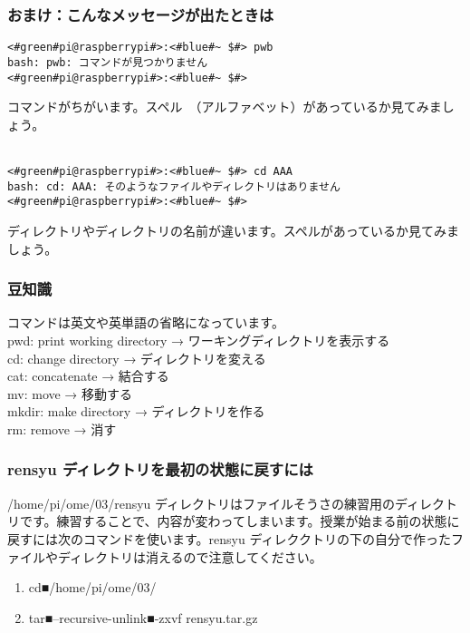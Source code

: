 \subsubsection{おまけ：こんなメッセージが出たときは}
\begin{lstlisting}[caption=コマンドがちがうときの例, label=cmdMiss]
<#green#pi@raspberrypi#>:<#blue#~ $#> pwb
bash: pwb: コマンドが見つかりません
<#green#pi@raspberrypi#>:<#blue#~ $#> 
\end{lstlisting}
コマンドがちがいます。スペル　（アルファベット）があっているか見てみましょう。\\\\

\begin{lstlisting}[caption=ディレクトリやファイルの名前がちがうときの例, label=nameMiss]
<#green#pi@raspberrypi#>:<#blue#~ $#> cd AAA
bash: cd: AAA: そのようなファイルやディレクトリはありません
<#green#pi@raspberrypi#>:<#blue#~ $#> 
\end{lstlisting}
ディレクトリやディレクトリの名前が違います。スペルがあっているか見てみましょう。\\

\subsubsection{豆知識}
コマンドは英文や英単語の省略になっています。\\
pwd: print working directory → ワーキングディレクトリを表示する\\
cd: change directory → ディレクトリを変える\\
cat: concatenate → 結合する\\
mv: move → 移動する\\
mkdir: make directory → ディレクトリを作る\\
rm: remove → 消す\\

\subsubsection{rensyu ディレクトリを最初の状態に戻すには}
/home/pi/ome/03/rensyu ディレクトリはファイルそうさの練習用のディレクトリです。練習することで、内容が変わってしまいます。授業が始まる前の状態に戻すには次のコマンドを使います。rensyu ディレククトリの下の自分で作ったファイルやディレクトリは消えるので注意してください。\\
\begin{enumerate}
\item  cd■/home/pi/ome/03/
\item  tar■--recursive-unlink■-zxvf rensyu.tar.gz
\end{enumerate}



















